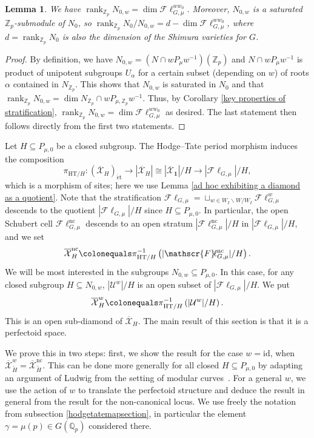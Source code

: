 \documentclass{amsart}
\newtheorem{lemma}[subsubsection]{Lemma}
\theoremstyle{remark}
\numberwithin{equation}{subsection}
\newcommand{\Q}{\QQ}
\newcommand{\Z}{\ZZ}
\newcommand{\QQ}{{\mathbb Q}}
\newcommand{\ZZ}{{\mathbb Z}}
\newcommand{\cU}{{\mathcal U}}
\newcommand{\Zp}{\Z_p}
\newcommand{\Qp}{\Q_p}
\DeclareMathOperator{\rank}{rank}
\newcommand{\HT}{\mathrm{HT}}
\newcommand{\id}{\mathrm{id}}
\newcommand{\et}{\mathrm{\acute{e}t}}
\newcommand{\mbf}{\mathbf}
\newcommand{\Fl}{\mathscr{F}\!\ell}
\newcommand{\tH}{\widetilde{H}}
\newcommand{\ocX}{\overline{\mathcal{X}}}
\newcommand{\nc}{\mathrm{nc}}
\newcommand{\sub}{\subseteq}
\newcommand{\defeq}{\colonequals}
\renewcommand{\(}{\left(}
\renewcommand{\)}{\right)}
\begin{document}
\begin{lemma}\label{ranks} We have $\rank_{\Z_p} N_{0,w} = \dim \Fl^{w w_0}_{G,\mu}$. Moreover, $N_{0,w}$ is a saturated $\Zp$-submodule of $N_{0}$, so $\rank_{\Z_p} N_{0}/N_{0,w} = d - \dim \Fl^{w w_0}_{G,\mu}$, where $d = \rank_{\Zp}N_0$ is also the dimension of the Shimura varieties for $G$.
\end{lemma}
\begin{proof}
By definition, we have $N_{0,w}= \left( N \cap w P_{\mu}w^{-1} \right)(\Zp)$ and  $N \cap wP_{\mu}w^{-1}$ is product of unipotent subgroups $U_{\alpha}$ for a certain subset (depending on $w$) of roots $\alpha$ contained in $N_{\Zp}$. This shows that $N_{0,w}$ is saturated in $N_0$ and that $\rank_{\Z_p} N_{0,w} = \dim N_{\Zp} \cap w P_{\mu,\Zp}w^{-1}$. Thus, by Corollary \ref{key properties of stratification}, $\rank_{\Z_p} N_{0,w} = \dim \Fl_{G,\mu}^{w w_{0}}$ as desired. The last statement then follows directly from the first two statements.
\end{proof}

\noindent Let $H \sub P_{\mu,0}$ be a closed subgroup. The Hodge--Tate period morphism induces the composition 
\[
\pi_{\HT/H}\colon (\ocX_{H})_{\et} \to 
|\ocX_{H}|\cong |\ocX_{\mbf{1}}|/ H \to |\Fl_{G,\mu}|/ H,
\] 
which is a morphism of sites; here we use Lemma \ref{ad hoc exhibiting a diamond as a quotient}. Note that the stratification $\Fl_{G,\mu} = \sqcup_{w\in W_I \backslash W/W_I} \Fl^w_{G,\mu}$
descends to the quotient $|\Fl_{G,\mu}|/H$ since $H \sub P_{\mu,0}$. In particular, the open Schubert cell $\Fl_{G,\mu}^{\nc}$ 
descends to an open stratum $|\Fl_{G,\mu}^{\nc}|/H$ in $|\Fl_{G,\mu}|/ H$, and we set
\[
\ocX_{H}^{\mathrm{nc}} \defeq \pi_{\HT/H}^{-1}\left(|\Fl_{G,\mu}^{\nc}|/H \right).
\]
We will be most interested in the subgroups $N_{0,w}\sub P_{\mu,0}$. In this case, for any closed subgroup $H \sub N_{0,w}$,
$|\cU^w|/H$ is an open subset of $|\Fl_{G,\mu}|/H$.
We put 
\[
\ocX^{w}_{H} \defeq 
\pi_{\HT/H}^{-1}\left(|\cU^w|/H\right).
\]
This is an open sub-diamond of $\ocX_{H}$. The main result of this section is that it is a perfectoid space. 

\medskip

We prove this in two steps: first, we show the result for the case $w=\id$, when $\ocX^{w}_{\tH} = \ocX^{\mathrm{nc}}_{\tH}$. This can be done more generally for all closed $H \sub P_{\mu,0}$ by adapting an argument of Ludwig from the setting of modular curves~\cite[Sect. 3.4]{ludwig}. For a general $w$, we use the action of $w$ to translate the perfectoid structure and deduce the result in general from the result for the non-canonical locus. We use freely the notation from subsection \ref{hodgetatemapsection}, in particular the element $\gamma = \mu(p) \in G(\Qp)$ considered there.
\end{document}
